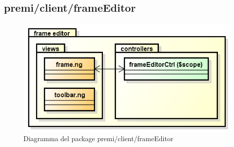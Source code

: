 \subsection{premi/client/frameEditor}
\begin{figure}[h]
\begin{center}
\includegraphics[scale=0.90]{img/diapkg/frameEditor.png}
\caption{Diagramma del package premi/client/frameEditor}
\end{center}
\end{figure}








